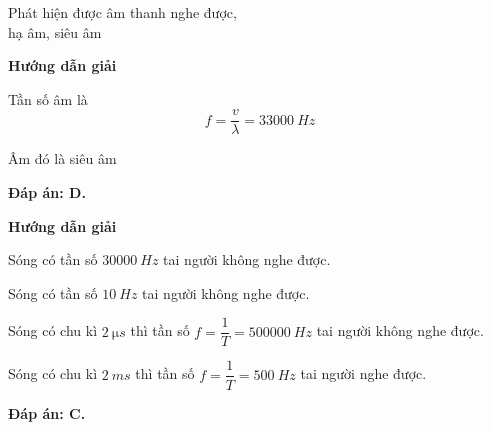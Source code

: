 \begin{dang}{Phát hiện được âm thanh nghe được,\\ hạ âm, siêu âm}
	{\begin{center}
			\textbf{Hướng dẫn giải}
		\end{center}
		
		Tần số âm là
		$$f=\dfrac{v}{\lambda} = \SI{33000}{Hz}$$
		
		Âm đó là siêu âm
		
		\textbf{Đáp án: D.}
		
	}
	{\begin{center}
			\textbf{Hướng dẫn giải}
		\end{center}
		Sóng có tần số $\SI{30000}{Hz}$ tai người không nghe được.
		
		Sóng có tần số $\SI{10}{Hz}$ tai người không nghe được.
		
		Sóng có chu kì $\SI{2}{\micro s}$ thì tần số $f=\dfrac{1}{T}=\SI{500000}{Hz}$ tai người không nghe được.
		
		Sóng có chu kì $\SI{2}{ms}$ thì tần số $f=\dfrac{1}{T}=\SI{500}{Hz}$ tai người nghe được.
		
		\textbf{Đáp án: C.}
		
	}
\end{dang}